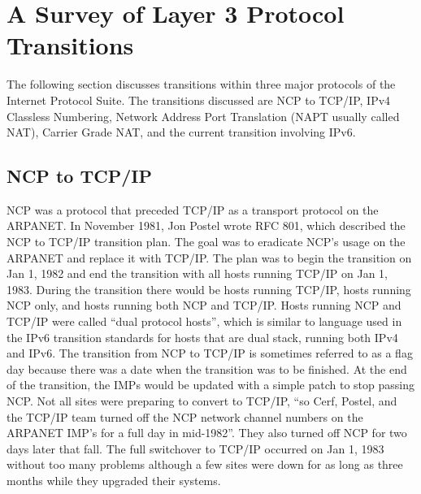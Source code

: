 \nopagebreak
\section {A Survey of Layer 3 Protocol Transitions}
The following section discusses transitions within three major
protocols of the Internet Protocol Suite. The transitions discussed
are NCP to TCP/IP, IPv4 Classless Numbering, Network Address
Port Translation (NAPT usually called NAT), Carrier Grade NAT,
and the current transition involving IPv6.

\subsection{NCP to TCP/IP}
NCP was a protocol that preceded TCP/IP as a transport protocol
on the ARPANET.  In November 1981, Jon Postel wrote RFC 801, which
described the NCP to TCP/IP transition plan.  The goal was to eradicate
NCP's usage on the ARPANET and replace it with TCP/IP.  The plan was
to begin the transition on Jan 1, 1982 and end the transition with
all hosts running TCP/IP on Jan 1, 1983.  During the transition
there would be hosts running TCP/IP, hosts running NCP only, and
hosts running both NCP and TCP/IP.  Hosts running NCP and TCP/IP
were called ``dual protocol hosts'', which is similar to language
used in the IPv6 transition standards for hosts that are dual stack,
running both IPv4 and IPv6.  The transition from NCP to TCP/IP is sometimes referred to as a flag
day because there was a date when the transition was to be finished.
At the end of the transition, the IMPs would be updated with a
simple patch to stop passing NCP.  Not all sites were preparing to
convert to TCP/IP, ``so Cerf, Postel, and the TCP/IP team turned off
the NCP network channel numbers on the ARPANET IMP's for a full day
in mid-1982''\cite{Imp01}.  They also turned off NCP for two days
later that fall.  The full switchover to TCP/IP occurred on Jan 1,
1983 without too many problems although a few sites were down for
as long as three months while they upgraded their systems.

